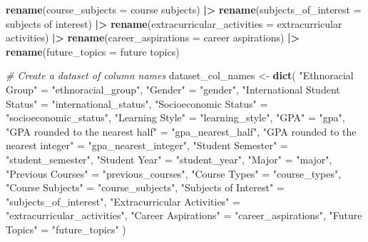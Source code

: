 \documentclass[
  twocolumn]{article}
\newenvironment{Shaded}{\begin{snugshade}}{\end{snugshade}}
\newcommand{\AttributeTok}[1]{\textcolor[rgb]{0.13,0.29,0.53}{#1}}
\newcommand{\CommentTok}[1]{\textcolor[rgb]{0.56,0.35,0.01}{\textit{#1}}}
\newcommand{\FunctionTok}[1]{\textcolor[rgb]{0.13,0.29,0.53}{\textbf{#1}}}
\newcommand{\NormalTok}[1]{#1}
\newcommand{\OtherTok}[1]{\textcolor[rgb]{0.56,0.35,0.01}{#1}}
\newcommand{\SpecialCharTok}[1]{\textcolor[rgb]{0.81,0.36,0.00}{\textbf{#1}}}
\newcommand{\StringTok}[1]{\textcolor[rgb]{0.31,0.60,0.02}{#1}}
\begin{document}
\begin{Shaded}
\begin{Highlighting}[]
  \FunctionTok{rename}\NormalTok{(}\AttributeTok{course\_subjects =} \StringTok{\textasciigrave{}}\AttributeTok{course subjects}\StringTok{\textasciigrave{}}\NormalTok{) }\SpecialCharTok{|\textgreater{}}
  \FunctionTok{rename}\NormalTok{(}\AttributeTok{subjects\_of\_interest =} \StringTok{\textasciigrave{}}\AttributeTok{subjects of interest}\StringTok{\textasciigrave{}}\NormalTok{) }\SpecialCharTok{|\textgreater{}}
  \FunctionTok{rename}\NormalTok{(}\AttributeTok{extracurricular\_activities =} \StringTok{\textasciigrave{}}\AttributeTok{extracurricular activities}\StringTok{\textasciigrave{}}\NormalTok{) }\SpecialCharTok{|\textgreater{}}
  \FunctionTok{rename}\NormalTok{(}\AttributeTok{career\_aspirations =} \StringTok{\textasciigrave{}}\AttributeTok{career aspirations}\StringTok{\textasciigrave{}}\NormalTok{) }\SpecialCharTok{|\textgreater{}}
  \FunctionTok{rename}\NormalTok{(}\AttributeTok{future\_topics =} \StringTok{\textasciigrave{}}\AttributeTok{future topics}\StringTok{\textasciigrave{}}\NormalTok{)}

\CommentTok{\# Create a dataset of column names}
\NormalTok{dataset\_col\_names }\OtherTok{\textless{}{-}} \FunctionTok{dict}\NormalTok{(}
    \StringTok{"Ethnoracial Group"} \OtherTok{=} \StringTok{"ethnoracial\_group"}\NormalTok{,}
    \StringTok{"Gender"} \OtherTok{=} \StringTok{"gender"}\NormalTok{,}
    \StringTok{"International Student Status"} \OtherTok{=} \StringTok{"international\_status"}\NormalTok{,}
    \StringTok{"Socioeconomic Status"} \OtherTok{=} \StringTok{"socioeconomic\_status"}\NormalTok{,}
    \StringTok{"Learning Style"} \OtherTok{=} \StringTok{"learning\_style"}\NormalTok{,}
    \StringTok{"GPA"} \OtherTok{=} \StringTok{"gpa"}\NormalTok{,}
    \StringTok{"GPA rounded to the nearest half"} \OtherTok{=} \StringTok{"gpa\_nearest\_half"}\NormalTok{,}
    \StringTok{"GPA rounded to the nearest integer"} \OtherTok{=} \StringTok{"gpa\_nearest\_integer"}\NormalTok{,}
    \StringTok{"Student Semester"} \OtherTok{=} \StringTok{"student\_semester"}\NormalTok{,}
    \StringTok{"Student Year"} \OtherTok{=} \StringTok{"student\_year"}\NormalTok{,}
    \StringTok{"Major"} \OtherTok{=} \StringTok{"major"}\NormalTok{,}
    \StringTok{"Previous Courses"} \OtherTok{=} \StringTok{"previous\_courses"}\NormalTok{,}
    \StringTok{"Course Types"} \OtherTok{=} \StringTok{"course\_types"}\NormalTok{,}
    \StringTok{"Course Subjects"} \OtherTok{=} \StringTok{"course\_subjects"}\NormalTok{,}
    \StringTok{"Subjects of Interest"} \OtherTok{=} \StringTok{"subjects\_of\_interest"}\NormalTok{,}
    \StringTok{"Extracurricular Activities"} \OtherTok{=} \StringTok{"extracurricular\_activities"}\NormalTok{,}
    \StringTok{"Career Aspirations"} \OtherTok{=} \StringTok{"career\_aspirations"}\NormalTok{,}
    \StringTok{"Future Topics"} \OtherTok{=} \StringTok{"future\_topics"}
\NormalTok{    )}
\end{Highlighting}
\end{Shaded}
\end{document}
